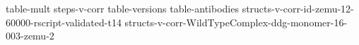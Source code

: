 


{table-mult}
{steps-v-corr}
{table-versions}
{table-antibodies}
{structs-v-corr-id-zemu-12-60000-rscript-validated-t14}
{structs-v-corr-WildTypeComplex-ddg-monomer-16-003-zemu-2}

